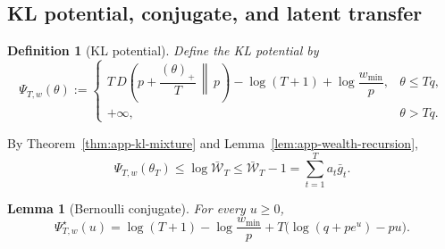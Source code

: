 \documentclass[11pt]{article}
\newtheorem{lemma}{Lemma}
\newtheorem{definition}{Definition}
\newcommand{\1}{\mathbf{1}}
\begin{document}
\subsection{KL potential, conjugate, and latent transfer}

\begin{definition}[KL potential]
\label{def:app-kl-potential}
Define the KL potential by
\[
\Psi_{T,w}(\theta)
:=
\begin{cases}
T\,D\!\left(p+\dfrac{(\theta)_+}{T}\,\middle\|\,p\right)-\log(T+1)+\log\dfrac{w_{\min}}{p},
& \theta\le Tq,\\[2ex]
+\infty, & \theta>Tq.
\end{cases}
\]
\end{definition}
By Theorem~\ref{thm:app-kl-mixture} and Lemma~\ref{lem:app-wealth-recursion},
\[
\Psi_{T,w}(\theta_T)\le \log \bar{\mathcal W}_T \le \bar{\mathcal W}_T-1 = \sum_{t=1}^T a_t\bar g_t.
\]

\begin{lemma}[Bernoulli conjugate]
\label{lem:app-bernoulli-conj}
For every \(u\ge 0\),
\[
\Psi_{T,w}^\star(u)
=
\log(T+1)-\log\frac{w_{\min}}{p}+T\bigl(\log(q+pe^u)-pu\bigr).
\]
\end{lemma}
\end{document}
